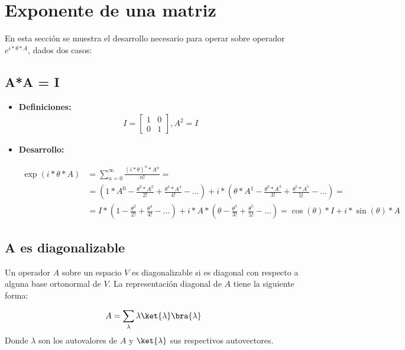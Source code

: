 \section{Exponente de una matriz}

En esta sección se muestra el desarrollo necesario para operar sobre operador $e^{i*\theta*A}$, dados dos casos:

\subsection{A*A = I}

\begin{itemize}
\item \textbf{Definiciones:}
  \begin{align*}
    I = \begin{bmatrix}
      1 & 0 \\
      0 & 1
    \end{bmatrix}
    , A^2 = I
  \end{align*}

\item \textbf{Desarrollo:}

  \begin{align*}
    \exp(i*\theta*A) &= \sum_{n = 0}^{\infty} \frac{{(i*\theta)}^n * A^n}{n!} = \\
                &= (1*A^0 - \frac{\theta^2*A^2}{2!} + \frac{\theta^4*A^4}{4!} - \ldots) +
                  i*(\theta*A^1 - \frac{\theta^3*A^3}{3!} + \frac{\theta^5*A^5}{5!} - \ldots) = \\
                &= I*(1 - \frac{\theta^2}{2!} + \frac{\theta^4}{4!} - \ldots) +
                  i*A*(\theta - \frac{\theta^3}{3!} + \frac{\theta^5}{5!} - \ldots)
                  = \cos(\theta)*I + i*\sin(\theta)*A
  \end{align*}
\end{itemize}

\subsection{A es diagonalizable\label{eq:8-funcion A diagonalizable}}

Un operador $A$ sobre un espacio $V$ es diagonalizable si es diagonal con respecto a alguna base ortonormal de $V$. La representación diagonal de $A$ tiene la siguiente forma:

\begin{align*}
  A = \sum_\lambda \lambda \ket{\lambda}\bra{\lambda}
\end{align*}
Donde $\lambda$ son los autovalores de $A$ y $\ket{\lambda}$ sus respectivos autovectores.

